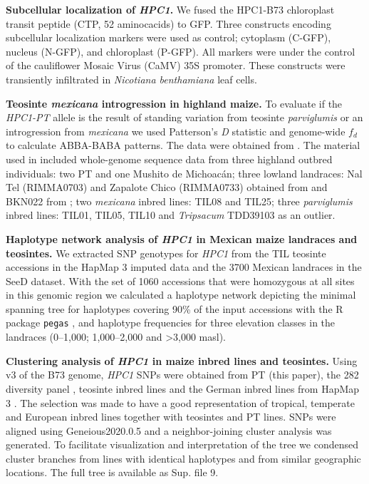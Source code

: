 \documentclass[9pt,twocolumn,twoside,lineno]{biorxiv}
\def\code#1{\texttt{#1}}
\begin{document}
\textbf{Subcellular localization of \textit{HPC1}.}
We fused the HPC1-B73 chloroplast transit peptide (CTP, 52 aminocacids) to GFP. 
Three constructs encoding subcellular localization markers were used as control; cytoplasm (C-GFP), nucleus (N-GFP), and chloroplast (P-GFP).
All markers were under the control of the cauliflower Mosaic Virus (CaMV) 35S promoter. 
These constructs were transiently infiltrated in \textit{Nicotiana benthamiana} leaf cells.

\textbf{Teosinte \textit{mexicana} introgression in highland maize.}
To evaluate if the \textit{HPC1-PT} allele is the result of standing variation from teosinte \textit{parviglumis} or an introgression from \textit{mexicana} we used Patterson's \textit{D} statistic and genome-wide $f_{d}$ to calculate ABBA-BABA patterns. 
The data were obtained from \cite{Gonzalez-Segovia2019-jy}. 
The material used in \cite{Gonzalez-Segovia2019-jy} included whole-genome sequence data from three highland outbred individuals: two PT and one Mushito de Michoacán; three lowland landraces: Nal Tel (RIMMA0703) and Zapalote Chico (RIMMA0733) obtained from \cite{Wang2017-bc} and  BKN022 from \cite{Bukowski2017-ng}; two \textit{mexicana} inbred lines: TIL08 and TIL25; three \textit{parviglumis} inbred lines: TIL01, TIL05, TIL10 and \textit{Tripsacum} TDD39103 \cite{Bukowski2017-ng} as an outlier. 

\textbf{Haplotype network analysis of \textit{HPC1} in Mexican maize landraces and teosintes.}
We extracted SNP genotypes for \textit{HPC1} from the TIL teosinte accessions in the HapMap 3 imputed data \cite{Bukowski2017-ng} and the 3700 Mexican landraces in the SeeD dataset. 
With the set of 1060 accessions that were homozygous at all sites in this genomic region we calculated a haplotype network depicting the minimal spanning tree for haplotypes covering 90\% of the input accessions with the R package \code{pegas} \cite{paradis2010}, and haplotype frequencies for three elevation classes in the landraces (0--1,000; 1,000--2,000 and >3,000 masl).

\textbf{Clustering analysis of \textit{HPC1} in maize inbred lines and teosintes.}
Using v3 of the B73 genome, \textit{HPC1} SNPs were obtained from PT (this paper), the 282 diversity panel \cite{Flint-Garcia2005-hb}, teosinte inbred lines and the German inbred lines from HapMap 3 \cite{Bukowski2017-ng}. 
The selection was made to have a good representation of tropical, temperate and European inbred lines together with teosintes and PT lines.
SNPs were aligned using Geneious2020.0.5 and a neighbor-joining cluster analysis was generated. 
To facilitate visualization and interpretation of the tree we condensed cluster branches from lines with identical haplotypes and from similar geographic locations. 
The full tree is available as Sup. file 9. 
\end{document}
